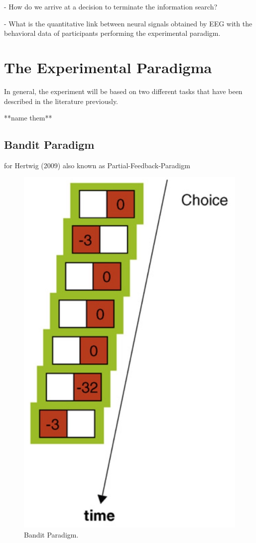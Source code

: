 \documentclass[
	12pt,
	oneside,
	bibliography=totocnumbered]{scrartcl}
\begin{document}
- How do we arrive at a decision to terminate the information search?

- What is the quantitative link between neural signals obtained by EEG with the behavioral data of participants performing the experimental paradigm. 






\section{The Experimental Paradigma}
In general, the experiment will be based on two different tasks that have been described in the literature previously. 

**name them**





\subsection{Bandit Paradigm}
for Hertwig (2009) also known as Partial-Feedback-Paradigm

\begin{figure}[h]
	\centering
	\includegraphics[scale=0.3]{pfp.jpg}
	\caption{Bandit Paradigm.}
	\label{fig:pfp}
\end{figure}
\end{document}
